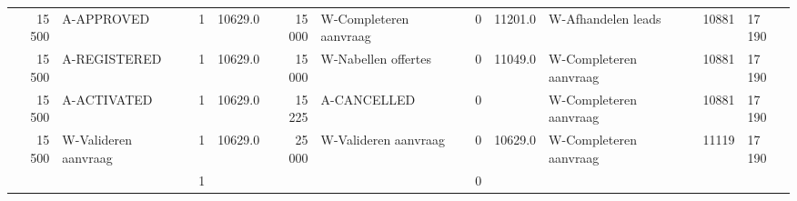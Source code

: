 \begin{tabular}{rlrlrlrllll}
15 500 & A-APPROVED & 1 & 10629.0 & 15 000 & W-Completeren aanvraag & 0 & 11201.0 & W-Afhandelen leads & 10881 & 17 190 \\
15 500 & A-REGISTERED & 1 & 10629.0 & 15 000 & W-Nabellen offertes & 0 & 11049.0 & W-Completeren aanvraag & 10881 & 17 190 \\
15 500 & A-ACTIVATED & 1 & 10629.0 & 15 225 & A-CANCELLED & 0 &  & W-Completeren aanvraag & 10881 & 17 190 \\
15 500 & W-Valideren aanvraag & 1 & 10629.0 & 25 000 & W-Valideren aanvraag & 0 & 10629.0 & W-Completeren aanvraag & 11119 & 17 190 \\
 &  & 1 &  &  &  & 0 &  &  &  &  \\
\bottomrule
\end{tabular}
